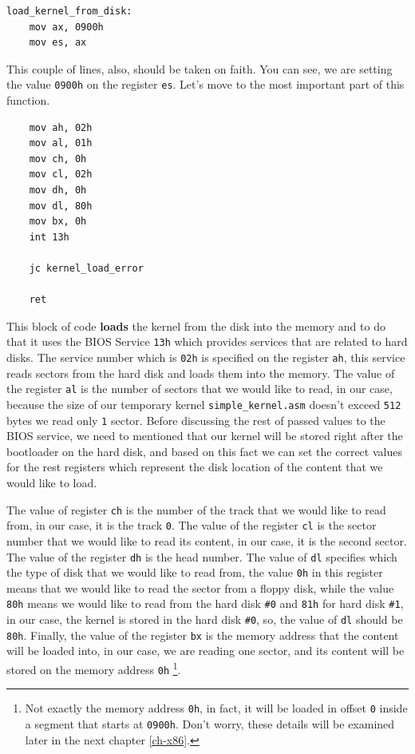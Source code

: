 \begin{lstlisting}
load_kernel_from_disk:
    mov ax, 0900h
    mov es, ax
\end{lstlisting}

This couple of lines, also, should be taken on faith. You can see, we
are setting the value \lstinline!0900h! on the register \lstinline!es!.
Let's move to the most important part of this function.

\begin{lstlisting}
    mov ah, 02h
    mov al, 01h
    mov ch, 0h
    mov cl, 02h
    mov dh, 0h
    mov dl, 80h
    mov bx, 0h
    int 13h
    
    jc kernel_load_error

    ret
\end{lstlisting}

This block of code \textbf{loads} the kernel from the disk into the
memory and to do that it uses the BIOS Service \lstinline!13h! which
provides services that are related to hard disks. The service number
which is \lstinline!02h! is specified on the register \lstinline!ah!,
this service reads sectors from the hard disk and loads them into the
memory. The value of the register \lstinline!al! is the number of
sectors that we would like to read, in our case, because the size of our
temporary kernel \lstinline!simple_kernel.asm! doesn't exceed
\lstinline!512! bytes we read only \lstinline!1! sector. Before
discussing the rest of passed values to the BIOS service, we need to
mentioned that our kernel will be stored right after the bootloader on
the hard disk, and based on this fact we can set the correct values for
the rest registers which represent the disk location of the content that
we would like to load.

The value of register \lstinline!ch! is the number of the track that we
would like to read from, in our case, it is the track \lstinline!0!. The
value of the register \lstinline!cl! is the sector number that we would
like to read its content, in our case, it is the second sector. The
value of the register \lstinline!dh! is the head number. The value of
\lstinline!dl! specifies which the type of disk that we would like to
read from, the value \lstinline!0h! in this register means that we would
like to read the sector from a floppy disk, while the value
\lstinline!80h! means we would like to read from the hard disk
\lstinline!#0! and \lstinline!81h! for hard disk \lstinline!#1!, in our
case, the kernel is stored in the hard disk \lstinline!#0!, so, the
value of \lstinline!dl! should be \lstinline!80h!. Finally, the value of
the register \lstinline!bx! is the memory address that the content will
be loaded into, in our case, we are reading one sector, and its content
will be stored on the memory address \lstinline!0h! \footnote{Not
  exactly the memory address \lstinline!0h!, in fact, it will be loaded
  in offset \lstinline!0! inside a segment that starts at
  \lstinline!0900h!. Don't worry, these details will be examined later
  in the next chapter \ref{ch-x86}.}.

